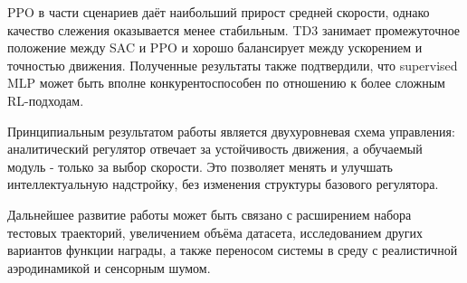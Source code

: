 PPO в части сценариев даёт наибольший прирост средней скорости, однако качество слежения оказывается менее стабильным.
TD3 занимает промежуточное положение между SAC и PPO и хорошо балансирует между ускорением и точностью движения.
Полученные результаты также подтвердили, что supervised MLP может быть вполне конкурентоспособен по отношению к более сложным RL-подходам.

Принципиальным результатом работы является двухуровневая схема управления: аналитический регулятор отвечает за устойчивость движения, а обучаемый модуль - только за выбор
скорости.
Это позволяет менять и улучшать интеллектуальную надстройку, без изменения структуры базового регулятора.

Дальнейшее развитие работы может быть связано с расширением набора тестовых траекторий, увеличением объёма датасета, исследованием других вариантов функции награды, а также
переносом системы в среду с реалистичной аэродинамикой и сенсорным шумом.